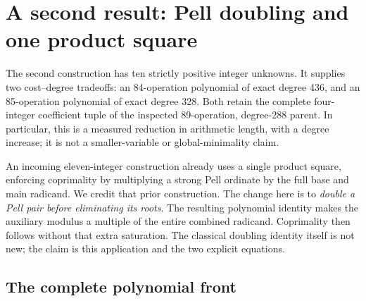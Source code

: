 \section{A second result: Pell doubling and one product square}
\label{sec:doubling-square}

The second construction has ten strictly positive integer unknowns.
It supplies two cost--degree tradeoffs: an 84-operation polynomial of
exact degree 436, and an 85-operation polynomial of exact degree 328.
Both retain the complete four-integer coefficient tuple of the inspected
89-operation, degree-288 parent.  In particular, this is a measured
reduction in arithmetic length, with a degree increase; it is not a
smaller-variable or global-minimality claim.

An incoming eleven-integer construction already uses a single product
square, enforcing coprimality by multiplying a strong Pell ordinate by
the full base and main radicand.  We credit that prior construction.
The change here is to \emph{double a Pell pair before eliminating its
roots}.  The resulting polynomial identity makes the auxiliary modulus
a multiple of the entire combined radicand.  Coprimality then follows
without that extra saturation.  The classical doubling identity itself
is not new; the claim is this application and the two explicit equations.

\subsection{The complete polynomial front}

